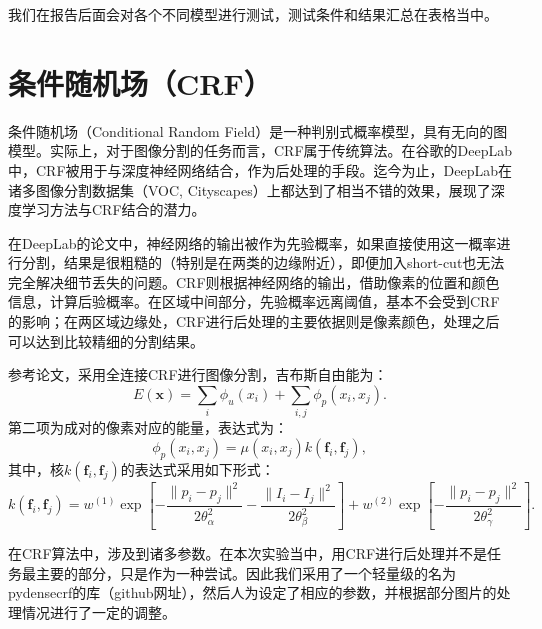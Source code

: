 \documentclass[a4paper,12pt]{article}
\begin{document}
\begin{CJK*}{UTF8}{gbsn}
\begin{spacing}{1.2}
    我们在报告后面会对各个不同模型进行测试，测试条件和结果汇总在表格当中。

    \section{条件随机场（CRF）}
    条件随机场（Conditional Random Field）是一种判别式概率模型，具有无向的图模型\cite{}。实际上，对于图像分割的任务而言，CRF属于传统算法。在谷歌的DeepLab中\cite{}，CRF被用于与深度神经网络结合，作为后处理的手段。迄今为止，DeepLab在诸多图像分割数据集（VOC, Cityscapes）上都达到了相当不错的效果，展现了深度学习方法与CRF结合的潜力。

    在DeepLab的论文中，神经网络的输出被作为先验概率，如果直接使用这一概率进行分割，结果是很粗糙的（特别是在两类的边缘附近），即便加入short-cut也无法完全解决细节丢失的问题。CRF则根据神经网络的输出，借助像素的位置和颜色信息，计算后验概率。在区域中间部分，先验概率远离阈值，基本不会受到CRF的影响；在两区域边缘处，CRF进行后处理的主要依据则是像素颜色，处理之后可以达到比较精细的分割结果。

    参考论文\cite{}，采用全连接CRF进行图像分割，吉布斯自由能为：
    \begin{equation}
    E(\textbf{x}) = \sum_{i} \phi_{u}(x_{i}) + \sum_{i, j} \phi_{p} (x_{i}, x_{j}).
    \end{equation}
    第二项为成对的像素对应的能量，表达式为：
    \begin{equation}
    \phi_{p}(x_{i}, x_{j}) = \mu(x_{i}, x_{j}) k(\textbf{f}_{i}, \textbf{f}_{j}),
    \end{equation}
    其中，核$k(\textbf{f}_{i}, \textbf{f}_{j})$的表达式采用如下形式：
    \begin{equation}
    k(\textbf{f}_{i}, \textbf{f}_{j}) = w^{(1)}\exp[-\frac{\| p_{i} - p_{j}\| ^{2}}{2\theta_{\alpha}^{2}} - \frac{\| I_{i} - I_{j}\| ^{2}}{2\theta_{\beta}^{2}}] + w^{(2)} \exp[-\frac{\| p_{i} - p_{j}\| ^{2}}{2\theta_{\gamma}^{2}}].
    \end{equation}

    在CRF算法中，涉及到诸多参数。在本次实验当中，用CRF进行后处理并不是任务最主要的部分，只是作为一种尝试。因此我们采用了一个轻量级的名为pydensecrf的库（github网址），然后人为设定了相应的参数，并根据部分图片的处理情况进行了一定的调整。


\end{spacing}
\end{CJK*}
\end{document}
